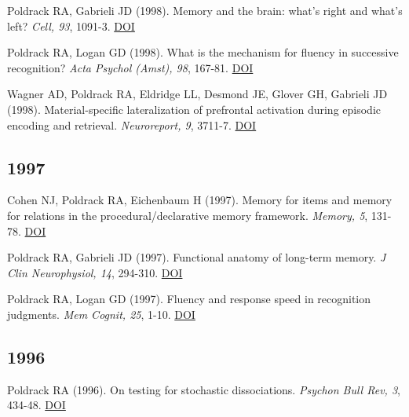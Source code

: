 Poldrack RA, Gabrieli JD (1998). Memory and the brain: what's right and what's left? \textit{Cell, 93}, 1091-3. \href{http://dx.doi.org/10.1016/s0092-8674(00)81451-8}{DOI} \vspace{2mm}

Poldrack RA, Logan GD (1998). What is the mechanism for fluency in successive recognition? \textit{Acta Psychol (Amst), 98}, 167-81. \href{http://dx.doi.org/10.1016/s0001-6918(97)00041-3}{DOI} \vspace{2mm}

Wagner AD, Poldrack RA, Eldridge LL, Desmond JE, Glover GH, Gabrieli JD (1998). Material-specific lateralization of prefrontal activation during episodic encoding and retrieval. \textit{Neuroreport, 9}, 3711-7. \href{http://dx.doi.org/10.1097/00001756-199811160-00026}{DOI} \vspace{2mm}

\subsection*{1997}

Cohen NJ, Poldrack RA, Eichenbaum H (1997). Memory for items and memory for relations in the procedural/declarative memory framework. \textit{Memory, 5}, 131-78. \href{http://dx.doi.org/10.1080/741941149}{DOI} \vspace{2mm}

Poldrack RA, Gabrieli JD (1997). Functional anatomy of long-term memory. \textit{J Clin Neurophysiol, 14}, 294-310. \href{http://dx.doi.org/10.1097/00004691-199707000-00003}{DOI} \vspace{2mm}

Poldrack RA, Logan GD (1997). Fluency and response speed in recognition judgments. \textit{Mem Cognit, 25}, 1-10. \href{http://dx.doi.org/10.3758/bf03197280}{DOI} \vspace{2mm}

\subsection*{1996}

Poldrack RA (1996). On testing for stochastic dissociations. \textit{Psychon Bull Rev, 3}, 434-48. \href{http://dx.doi.org/10.3758/bf03214547}{DOI} \vspace{2mm}

